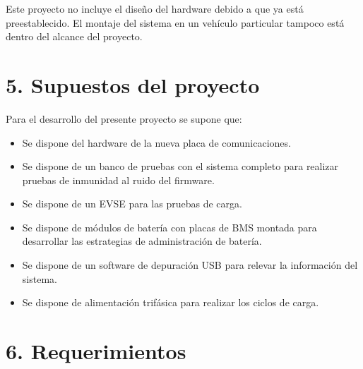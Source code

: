 \documentclass[
11pt, %
codirector, %
]{charter}
\begin{document}
Este proyecto no incluye el diseño del hardware debido a que ya está preestablecido. El montaje del sistema en un vehículo particular tampoco está dentro del alcance del proyecto.


\section{5. Supuestos del proyecto}
\label{sec:supuestos}

Para el desarrollo del presente proyecto se supone que:

\begin{itemize}
	\item Se dispone del hardware de la nueva placa de comunicaciones.
	\item Se dispone de un banco de pruebas con el sistema completo para realizar pruebas de inmunidad al ruido del firmware.
	\item Se dispone de un EVSE para las pruebas de carga.
	\item Se dispone de módulos de batería con placas de BMS montada para desarrollar las estrategias de administración de batería.
	\item Se dispone de un software de depuración USB para relevar la información del sistema.
	\item Se dispone de alimentación trifásica para realizar los ciclos de carga.
\end{itemize}


\section{6. Requerimientos}
\label{sec:requerimientos}
\end{document}
